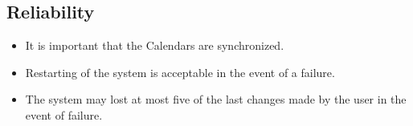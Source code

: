\subsection*{Reliability}
\begin{itemize}
	\item It is important that the Calendars are synchronized.
	\item Restarting of the system is acceptable in the event of a failure.
	\item The system may lost at most five of the last changes made by the user in the event of failure.
\end{itemize}